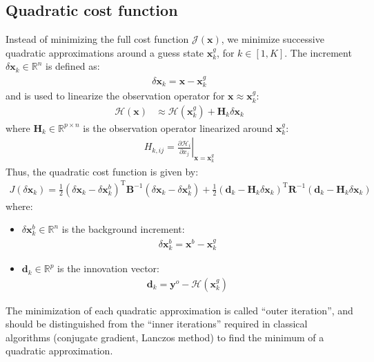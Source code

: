 \documentclass[12pt]{scrartcl}
\begin{document}
\subsection{Quadratic cost function}
Instead of minimizing the full cost function $\mathcal{J}(\mathbf{x})$, we minimize successive quadratic approximations around a guess state $\mathbf{x}^g_k$, for $k \in [1,K]$. The increment $\delta \mathbf{x}_k \in \mathbb{R}^n$ is defined as:
\begin{align}
\delta \mathbf{x}_k =  \mathbf{x}-\mathbf{x}^g_k
\end{align}
and is used to linearize the observation operator for $\mathbf{x} \approx \mathbf{x}^g_k$:
\begin{align}
\label{eq:linearize}
\mathcal{H}(\mathbf{x}) & \approx \mathcal{H}(\mathbf{x}^g_k) + \mathbf{H}_k \delta \mathbf{x}_k
\end{align}
where $\mathbf{H}_k \in \mathbb{R}^{p \times n}$ is the observation operator linearized around $\mathbf{x}^g_k$:
\begin{align}
\label{eq:h_linearization}
H_{k,ij} = \left.\frac{\partial \mathcal{H}_i}{\partial x_j}\right|_{\mathbf{x} = \mathbf{x}^g_k}
\end{align}
Thus, the quadratic cost function is given by:
\begin{align}
\label{eq:cost_quad}
J \left(\delta \mathbf{x}_k\right) = \frac{1}{2} \left(\delta \mathbf{x}_k-\delta \mathbf{x}^b_k\right)^\mathrm{T} \mathbf{B}^{-1} \left(\delta \mathbf{x}_k-\delta \mathbf{x}^b_k\right) + \frac{1}{2} \left(\mathbf{d}_k - \mathbf{H}_k \delta \mathbf{x}_k\right)^\mathrm{T} \mathbf{R}^{-1} \left(\mathbf{d}_k - \mathbf{H}_k \delta \mathbf{x}_k\right)
\end{align}
where:
\begin{itemize}
\item $\delta \mathbf{x}^b_k  \in \mathbb{R}^n$ is the background increment:
\begin{align}
\delta \mathbf{x}^b_k = \mathbf{x}^b - \mathbf{x}^g_k
\end{align}
\item $\mathbf{d}_k \in \mathbb{R}^p$ is the innovation vector:
\begin{align}
\label{eq:innovation}
\mathbf{d}_k = \mathbf{y}^o - \mathcal{H}(\mathbf{x}^g_k)
\end{align}
\end{itemize}
The minimization of each quadratic approximation is called ``outer iteration'', and should be distinguished from the ``inner iterations'' required in classical algorithms (conjugate gradient, Lanczos method) to find the minimum of a quadratic approximation.
\end{document}
